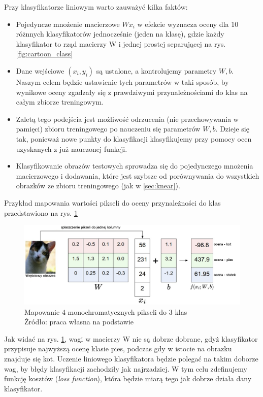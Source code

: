 Przy klasyfikatorze liniowym warto zauważyć kilka faktów:
\begin{itemize}
	\item Pojedyncze mnożenie macierzowe $Wx_i$ w efekcie wyznacza oceny dla 10 różnnych klasyfikatorów jednocześnie (jeden na klasę), gdzie każdy klasyfikator to rząd macierzy W i jednej prostej separującej na rys. \ref{fig:cartoon_class}
	\item Dane wejściowe $(x_i,y_i)$ są ustalone, a kontrolujemy parametry $W,b$. Naszym celem będzie ustawienie tych parametrów w taki sposób, by wynikowe oceny zgadzały się z prawdziwymi przynależnościami do klas na całym zbiorze treningowym.
	\item Zaletą tego podejścia jest możliwość odrzucenia (nie przechowywania w pamięci) zbioru treningowego po nauczeniu się parametrów $W,b$. Dzieje się tak, ponieważ nowe punkty do klasyfikacji klasyfikujemy przy pomocy ocen uzyskanych z już nauczonej funkcji.
	\item Klasyfikowanie obrazów testowych sprowadza się do pojedynczego mnożenia macierzowego i dodawania, które jest szybsze od porównywania do wszystkich obrazków ze zbioru treningowego (jak w \ref{sec:knear}).
\end{itemize}

Przykład mapowania wartości pikseli do oceny przynależności do klas przedstawiono na rys. \ref{fig:lin_class}
\begin{figure}[h!tb]
	 \centering
	 \includegraphics[width = 1.0\linewidth]{img/lin_klas}
	 \caption{Mapowanie 4 monochromatycznych pikseli do 3 klas \\
              Źródło: praca własna na podstawie \cite{cs231n}}
	 \label{fig:lin_class}
\end{figure}

Jak widać na rys. \ref{fig:lin_class}, wagi w macierzy W nie są dobrze dobrane, gdyż klasyfikator przypisuje najwyższą ocenę klasie pies, podczas gdy w istocie na obrazku znajduje się kot.
Uczenie liniowego klasyfikatora będzie polegać na takim doborze wag, by błędy klasyfikacji zachodziły jak najrzadziej.
W tym celu zdefinujemy funkcję kosztów (\textit{loss function}), która będzie miarą tego jak dobrze działa dany klasyfikator.\cite{cs231n}

